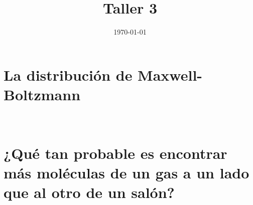 \documentclass[a4paper]{article}
\date{\today}
\title{Taller 3}
\begin{document}
    \header{}

    \section{La distribución de Maxwell-Boltzmann}
    \\
    
    
    
    
    
    
    
    
    
    
    \section{ ¿Qué tan probable es encontrar más moléculas de un gas a 
    un lado que al otro de un salón?}
    
    
    
    
    
    
    
\end{document}
